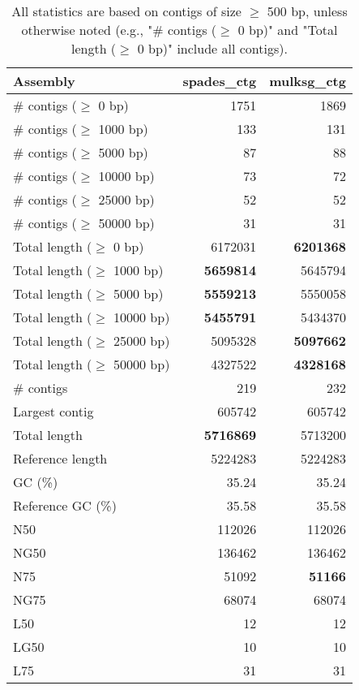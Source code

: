 \documentclass[12pt,a4paper]{article}
\begin{document}
\begin{table}[ht]
\begin{center}
\caption{All statistics are based on contigs of size $\geq$ 500 bp, unless otherwise noted (e.g., "\# contigs ($\geq$ 0 bp)" and "Total length ($\geq$ 0 bp)" include all contigs).}
\begin{tabular}{|l*{2}{|r}|}
\hline
Assembly & spades\_ctg & mulksg\_ctg \\ \hline
\# contigs ($\geq$ 0 bp) & 1751 & 1869 \\ \hline
\# contigs ($\geq$ 1000 bp) & 133 & 131 \\ \hline
\# contigs ($\geq$ 5000 bp) & 87 & 88 \\ \hline
\# contigs ($\geq$ 10000 bp) & 73 & 72 \\ \hline
\# contigs ($\geq$ 25000 bp) & 52 & 52 \\ \hline
\# contigs ($\geq$ 50000 bp) & 31 & 31 \\ \hline
Total length ($\geq$ 0 bp) & 6172031 & {\bf 6201368} \\ \hline
Total length ($\geq$ 1000 bp) & {\bf 5659814} & 5645794 \\ \hline
Total length ($\geq$ 5000 bp) & {\bf 5559213} & 5550058 \\ \hline
Total length ($\geq$ 10000 bp) & {\bf 5455791} & 5434370 \\ \hline
Total length ($\geq$ 25000 bp) & 5095328 & {\bf 5097662} \\ \hline
Total length ($\geq$ 50000 bp) & 4327522 & {\bf 4328168} \\ \hline
\# contigs & 219 & 232 \\ \hline
Largest contig & 605742 & 605742 \\ \hline
Total length & {\bf 5716869} & 5713200 \\ \hline
Reference length & 5224283 & 5224283 \\ \hline
GC (\%) & 35.24 & 35.24 \\ \hline
Reference GC (\%) & 35.58 & 35.58 \\ \hline
N50 & 112026 & 112026 \\ \hline
NG50 & 136462 & 136462 \\ \hline
N75 & 51092 & {\bf 51166} \\ \hline
NG75 & 68074 & 68074 \\ \hline
L50 & 12 & 12 \\ \hline
LG50 & 10 & 10 \\ \hline
L75 & 31 & 31 \\ \hline

\end{tabular}
\end{center}
\end{table}
\end{document}
